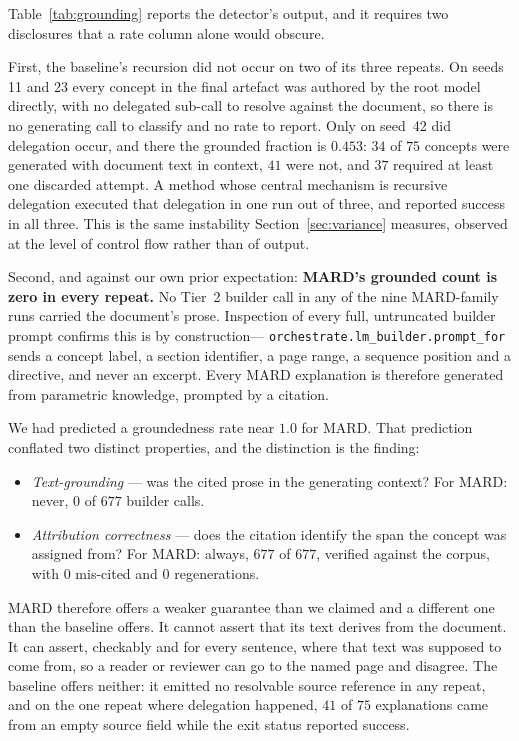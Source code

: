 \documentclass[conference]{IEEEtran}
\begin{document}
Table~\ref{tab:grounding} reports the detector's output, and it requires two
disclosures that a rate column alone would obscure.

First, the baseline's recursion did not occur on two of its three repeats. On
seeds 11 and 23 every concept in the final artefact was authored by the root
model directly, with no delegated sub-call to resolve against the document, so
there is no generating call to classify and no rate to report. Only on
seed~42 did delegation occur, and there the grounded fraction is $0.453$:
$34$ of $75$ concepts were generated with document text in context, $41$ were
not, and $37$ required at least one discarded attempt. A method whose central
mechanism is recursive delegation executed that delegation in one run out of
three, and reported success in all three. This is the same instability
Section~\ref{sec:variance} measures, observed at the level of control flow
rather than of output.

Second, and against our own prior expectation: \textbf{MARD's grounded count
is zero in every repeat.} No Tier~2 builder call in any of the nine
MARD-family runs carried the document's prose. Inspection of every full,
untruncated builder prompt confirms this is by construction---%
\texttt{orchestrate.lm\_builder.prompt\_for} sends a concept label, a section
identifier, a page range, a sequence position and a directive, and never an
excerpt. Every MARD explanation is therefore generated from parametric
knowledge, prompted by a citation.

We had predicted a groundedness rate near $1.0$ for MARD. That prediction
conflated two distinct properties, and the distinction is the finding:

\begin{itemize}
\item \emph{Text-grounding} --- was the cited prose in the generating
context? For MARD: never, $0$ of $677$ builder calls.
\item \emph{Attribution correctness} --- does the citation identify the span
the concept was assigned from? For MARD: always, $677$ of $677$, verified
against the corpus, with $0$ mis-cited and $0$ regenerations.
\end{itemize}

MARD therefore offers a weaker guarantee than we claimed and a different one
than the baseline offers. It cannot assert that its text derives from the
document. It can assert, checkably and for every sentence, where that text
was supposed to come from, so a reader or reviewer can go to the named page
and disagree. The baseline offers neither: it emitted no resolvable source
reference in any repeat, and on the one repeat where delegation happened,
$41$ of $75$ explanations came from an empty source field while the exit
status reported success.
\end{document}
